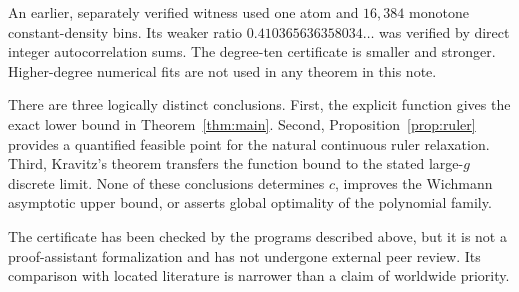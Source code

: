\documentclass[11pt,a4paper]{article}
\theoremstyle{remark}\newtheorem{remark}[theorem]{Remark}
\begin{document}
An earlier, separately verified witness used one atom and $16{,}384$ monotone constant-density bins. Its weaker ratio $0.410365636358034\ldots$ was verified by direct integer autocorrelation sums. The degree-ten certificate is smaller and stronger. Higher-degree numerical fits are not used in any theorem in this note.

There are three logically distinct conclusions. First, the explicit function gives the exact lower bound in Theorem~\ref{thm:main}. Second, Proposition~\ref{prop:ruler} provides a quantified feasible point for the natural continuous ruler relaxation. Third, Kravitz's theorem transfers the function bound to the stated large-$g$ discrete limit. None of these conclusions determines $c$, improves the Wichmann asymptotic upper bound, or asserts global optimality of the polynomial family.

The certificate has been checked by the programs described above, but it is not a proof-assistant formalization and has not undergone external peer review. Its comparison with located literature is narrower than a claim of worldwide priority.
\end{document}
